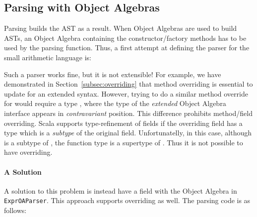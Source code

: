 \subsection{Parsing with Object Algebras}\label{subsec:parsingwithoa}

Parsing builds the AST as a result. When Object Algebras are used 
to build ASTs, an Object Algebra containing the constructor/factory
methods has to be used by the parsing function. Thus, a first attempt 
at defining the parser for the small arithmetic language is:

\begin{comment}
\inlinecode{ExprAlg} is defined for a small language using Object Algebras. Since Object Algebras represent ``objects'' implicitly as functions like \inlinecode{ExprAlg[E] =>} \inlinecode{E} for abstract \inlinecode{E}, we first try to build the corresponding parser by type \inlinecode{ExprAlg[E] =>} \inlinecode{Parser[E]}.
\end{comment}

Such a parser works fine, but it is not extensible! For example, we have demonstrated in Section~\ref{subsec:overriding} that method overriding is essential to update  for an extended syntax. However, trying to do a similar method override for  would require a type  , where the type of the \emph{extended} Object Algebra interface appears in \emph{contravariant} position. This difference prohibits method/field overriding. Scala supports type-refinement of fields if the overriding 
field has a type which is a \emph{subtype} of the original field.
Unfortunatelly, in this case, although  is a subtype 
of , the function type   is a supertype of  . Thus it is not possible to have overriding. 


\paragraph{A Solution}
A solution to this problem is instead have a field with the Object Algebra
in \lstinline{ExprOAParser}. This approach supports overriding as well. 
The parsing code is as follows:


